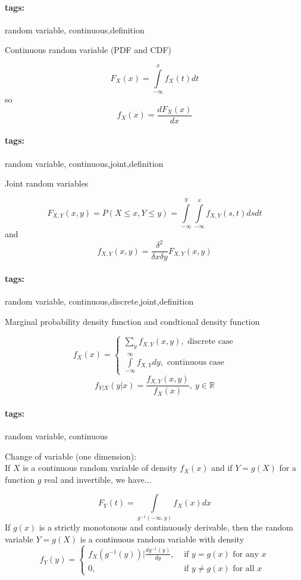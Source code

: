 \documentclass[12pt]{article}
\newcommand*{\xfield}[1]{\begin{mdframed}\centering #1\end{mdframed}\bigskip}
\newenvironment{note}{}{}
\newcommand*{\tags}[1]{\paragraph{tags: }#1}
\begin{document}
\begin{note}
	\tags{random variable, continuous,definition}
	\xfield{Continuous random variable (PDF and CDF)} %
	\xfield{$$F_X(x) = \int\limits_{-\infty}^x f_X(t) dt$$
so
$$f_X(x) = \frac{dF_X(x)}{dx}$$} %
\end{note}

\begin{note}
	\tags{random variable, continuous,joint,definition}
	\xfield{Joint random variables} %
	\xfield{$$F_{X,Y}(x,y) = P(X \le x, Y \le y) = \int\limits_{-\infty}^y
    \int\limits_{-\infty}^x f_{X,Y}(s,t)ds dt$$
    and
$$f_{X,Y}(x,y)=\frac{\delta^2}{\delta x \delta y}F_{X,Y}(x,y)$$} %
\end{note}

\begin{note}
	\tags{random variable, continuous,discrete,joint,definition}
	\xfield{Marginal probability density function and condtional density function} %
	\xfield{$$f_X(x) = \begin{cases} \sum\limits_y f_{X,Y}(x,y),\text{ discrete
        case}\\
      \int\limits_{-\infty}^{\infty}f_{X,Y}dy,\text{ continuous case}
\end{cases}$$
$$f_{Y|X}(y|x) = \frac{f_{X,Y}(x,y)}{f_X(x)},\ y \in \mathbb{R}$$} %
\end{note}

\begin{note}
	\tags{random variable, continuous}
	\xfield{Change of variable (one dimension):\\
If $X$ is a continuous random variable of density $f_X(x)$ and if
    $Y=g(X)$ for a function $g$ real and invertible, we have...} %
	\xfield{$$F_Y(t) = \int\limits_{g^{-1}(-\infty,y)}f_X(x)dx$$
If $g(x)$ is a strictly monotonous and continuously derivable, then the random
variable $Y=g(X)$ is a continuous random variable with density
$$f_Y(y) = \begin{cases}
f_X(g^{-1}(y))|\frac{d g^{-1}(y)}{dy}, &\text{ if $y=g(x)$ for any $x$}\\
0,&\text{ if $y \neq g(x)$ for all $x$}
\end{cases}$$
    } %
\end{note}
\end{document}
